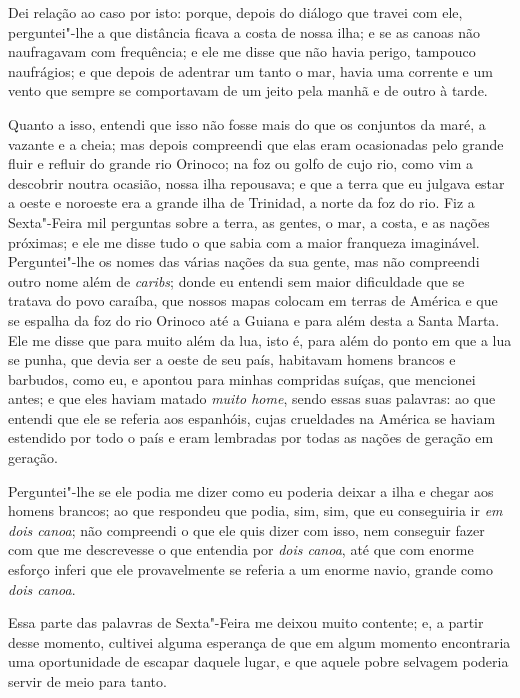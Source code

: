 Dei relação ao caso por isto: porque, depois do diálogo que travei com
ele, perguntei"-lhe a que distância ficava a costa de nossa ilha; e se as
canoas não naufragavam com frequência; e ele me disse que não havia
perigo, tampouco naufrágios; e que depois de adentrar um tanto o mar,
havia uma corrente e um vento que sempre se comportavam de um jeito pela
manhã e de outro à tarde.

Quanto a isso, entendi que isso não fosse mais do que os conjuntos da
maré, a vazante e a cheia; mas depois compreendi que elas eram
ocasionadas pelo grande fluir e refluir do grande rio Orinoco; na foz ou
golfo de cujo rio, como vim a descobrir noutra ocasião, nossa ilha
repousava; e que a terra que eu julgava estar a oeste e noroeste era a
grande ilha de Trinidad, a norte da foz do rio. Fiz a Sexta"-Feira mil
perguntas sobre a terra, as gentes, o mar, a costa, e as nações
próximas; e ele me disse tudo o que sabia com a maior franqueza
imaginável. Perguntei"-lhe os nomes das várias nações da sua gente, mas
não compreendi outro nome além de \emph{caribs}; donde eu entendi sem
maior dificuldade que se tratava do povo caraíba, que nossos mapas
colocam em terras de América e que se espalha da foz do rio Orinoco até
a Guiana e para além desta a Santa Marta. Ele me disse que para muito
além da lua, isto é, para além do ponto em que a lua se punha, que devia
ser a oeste de seu país, habitavam homens brancos e barbudos, como eu, e
apontou para minhas compridas suíças, que mencionei antes; e que eles
haviam matado \emph{muito home}, sendo essas suas palavras: ao que
entendi que ele se referia aos espanhóis, cujas crueldades na América se
haviam estendido por todo o país e eram lembradas por todas as nações de
geração em geração.

Perguntei"-lhe se ele podia me dizer como eu poderia deixar a ilha e
chegar aos homens brancos; ao que respondeu que podia, sim, sim, que eu
conseguiria ir \emph{em dois canoa}; não compreendi o que ele quis dizer
com isso, nem conseguir fazer com que me descrevesse o que entendia por
\emph{dois canoa}, até que com enorme esforço inferi que ele
provavelmente se referia a um enorme navio, grande como \emph{dois
canoa}.

Essa parte das palavras de Sexta"-Feira me deixou muito contente; e, a
partir desse momento, cultivei alguma esperança de que em algum momento
encontraria uma oportunidade de escapar daquele lugar, e que aquele
pobre selvagem poderia servir de meio para tanto.

